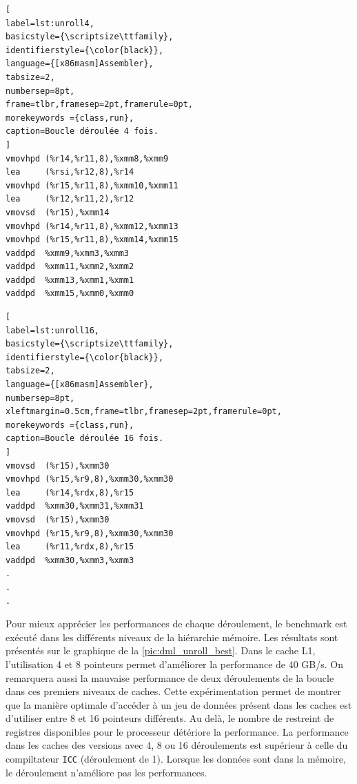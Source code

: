 \begin{minipage}{.45\textwidth}
\begin{lstlisting}[
label=lst:unroll4,
basicstyle={\scriptsize\ttfamily},
identifierstyle={\color{black}},
language={[x86masm]Assembler},
tabsize=2,
numbersep=8pt,
frame=tlbr,framesep=2pt,framerule=0pt,
morekeywords ={class,run},
caption=Boucle déroulée 4 fois.
]
vmovhpd (%r14,%r11,8),%xmm8,%xmm9
lea     (%rsi,%r12,8),%r14
vmovhpd (%r15,%r11,8),%xmm10,%xmm11
lea     (%r12,%r11,2),%r12
vmovsd  (%r15),%xmm14
vmovhpd (%r14,%r11,8),%xmm12,%xmm13
vmovhpd (%r15,%r11,8),%xmm14,%xmm15
vaddpd  %xmm9,%xmm3,%xmm3
vaddpd  %xmm11,%xmm2,%xmm2
vaddpd  %xmm13,%xmm1,%xmm1
vaddpd  %xmm15,%xmm0,%xmm0
\end{lstlisting}
\end{minipage}%
\hfill
%
\begin{minipage}{.45\textwidth}
\begin{lstlisting}[
label=lst:unroll16,
basicstyle={\scriptsize\ttfamily},
identifierstyle={\color{black}},
tabsize=2,
language={[x86masm]Assembler},
numbersep=8pt,
xleftmargin=0.5cm,frame=tlbr,framesep=2pt,framerule=0pt,
morekeywords ={class,run},
caption=Boucle déroulée 16 fois.
]
vmovsd  (%r15),%xmm30
vmovhpd (%r15,%r9,8),%xmm30,%xmm30
lea     (%r14,%rdx,8),%r15
vaddpd  %xmm30,%xmm31,%xmm31
vmovsd  (%r15),%xmm30
vmovhpd (%r15,%r9,8),%xmm30,%xmm30
lea     (%r11,%rdx,8),%r15
vaddpd  %xmm30,%xmm3,%xmm3
. 
. 
. 
\end{lstlisting}
\end{minipage}
    
    
    Pour mieux apprécier les performances de chaque déroulement, le benchmark est exécuté dans les différents niveaux de la hiérarchie mémoire. Les résultats sont présentés sur le graphique de la \autoref{pic:dml_unroll_best}. Dans le cache L1, l'utilisation 4 et 8 pointeurs permet d'améliorer la performance de 40 GB/s. On remarquera aussi la mauvaise performance de deux déroulements de la boucle dans ces premiers niveaux de caches. Cette expérimentation permet de montrer que la manière optimale d'accéder à un jeu de données présent dans les caches est d'utiliser entre 8 et 16 pointeurs différents. Au delà, le nombre de restreint de registres disponibles pour le processeur détériore la performance. La performance dans les caches des versions avec 4, 8 ou 16 déroulements est supérieur à celle du compiltateur \verb|ICC| (déroulement de 1). Lorsque les données sont dans la mémoire, le déroulement n'améliore pas les performances. 

